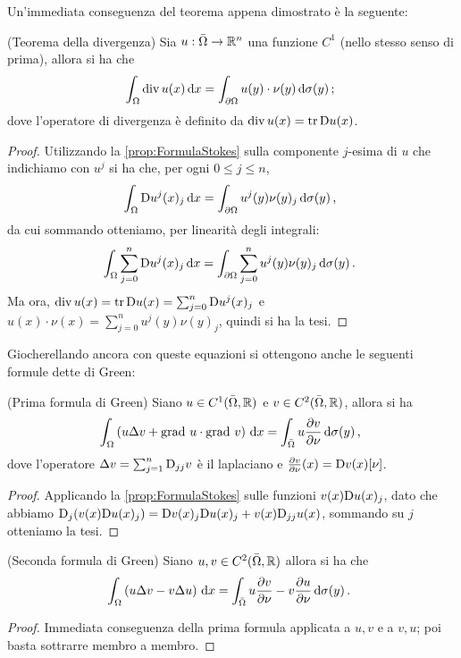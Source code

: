 Un'immediata conseguenza del teorema appena dimostrato è la seguente:

\begin{corollary}(Teorema della divergenza)
	\label{cor:thDivergenza}
	Sia $u:\bar\Omega \rightarrow \mathbb R^n$ una funzione $C^1$ (nello stesso senso di prima), allora si ha che
	\begin{equation}\label{eq:thDivergenza}
		\int_{\Omega} \operatorname{div} u (x) \,\mathrm d x = \int_{\partial \Omega} u(y)\cdot\nu(y) \,\mathrm d \sigma(y)\, \text{; }
	\end{equation}
	dove l'operatore di divergenza è definito da $\operatorname{div} u(x)=\operatorname{tr}\mathrm D u(x)$.
\end{corollary}

\begin{proof}
	Utilizzando la \cref{prop:FormulaStokes} sulla componente $j$-esima di $u$ che indichiamo con $u^j$ si ha che, per ogni $0\leq j\leq n$,
	\[
		\int_{\Omega} \mathrm D u^j(x)_j \,\mathrm d x = \int_{\partial \Omega} u^j(y)\nu(y)_j \,\mathrm d \sigma(y)\, \text{, }
	\]
	da cui sommando otteniamo, per linearità degli integrali:
	\[
		\int_{\Omega} \sum_{j=0}^n\mathrm D u^j(x)_j \,\mathrm d x = \int_{\partial \Omega} \sum_{j=0}^n u^j(y)\nu(y)_j \,\mathrm d \sigma(y)\, \text{. }
	\]
	Ma ora, $\operatorname{div} u (x)= \operatorname{tr}\mathrm D u(x) = \sum_{j=0}^n \mathrm D u^j(x)_j$ e $u(x)\cdot\nu(x)=\sum_{j=0}^n u^j(y)\nu(y)_j$,
	quindi si ha la tesi.
\end{proof}

Giocherellando ancora con queste equazioni si ottengono anche le seguenti formule dette di Green:

\begin{corollary}(Prima formula di Green)
	Siano $u\in C^1(\bar\Omega, \mathbb R)$ e $v\in C^2(\bar\Omega, \mathbb R)$, allora si ha
	\[
		\int_{\Omega} \left( u \Delta v+ \text{grad }u\cdot\text{grad }v \right) \,\mathrm d x=
		\int_{\bar \Omega} u \frac{\partial v}{\partial \nu} \,\mathrm d \sigma(y) \, \text{, }
	\]
	dove l'operatore $\Delta v = \sum_{j=1}^n \mathrm D_{jj} v$ è il laplaciano e $\frac{\partial v}{\partial \nu}(x)=\mathrm D v(x)[\nu]$.
\end{corollary}

\begin{proof}
	Applicando la \cref{prop:FormulaStokes} sulle funzioni $v(x)\mathrm D u(x)_j$, dato che abbiamo 
	$\mathrm D_j (v(x)\mathrm D u(x)_j ) = \mathrm D v(x)_j \mathrm D u(x)_j + v(x)\mathrm D_{jj} u(x)$, sommando su $j$ otteniamo la tesi.
\end{proof}

\begin{corollary}(Seconda formula di Green)
	Siano $u,v\in C^2(\bar\Omega, \mathbb R)$ allora si ha che
	\[
		\int_{\Omega}\left(u\Delta v-v\Delta u\right) \,\mathrm d x=
		\int_{\bar\Omega}u\frac{\partial v}{\partial\nu}-v\frac{\partial u}{\partial\nu} \,\mathrm d \sigma(y)\, \text{. }
	\]
\end{corollary}

\begin{proof}
	Immediata conseguenza della prima formula applicata a $u,v$ e a $v,u$; poi basta sottrarre membro a membro.
\end{proof}


